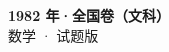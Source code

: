 \documentclass[zihao=-4, a4paper]{ctexart}
\begin{document}
\begin{center}
  {\Large\bfseries 1982 年·全国卷（文科）}\\[4pt]
  {\large 数学 · 试题版}
\end{center}
\medskip
{}

\end{document}
